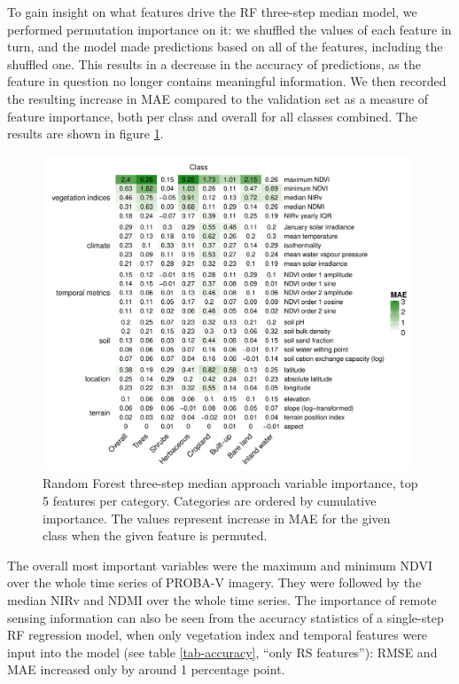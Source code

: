 \documentclass[review,authoryear,3p]{elsarticle}
\begin{document}
To gain insight on what features drive the \gls{RF} three-step median model, we performed permutation importance on it:
we shuffled the values of each feature in turn, and the model made predictions based on all of the features, including the shuffled one.
This results in a decrease in the accuracy of predictions, as the feature in question no longer contains meaningful information.
We then recorded the resulting increase in \gls{MAE} compared to the validation set as a measure of feature importance, both per class and overall for all classes combined.
%
The results are shown in figure \ref{fig-varimp}.

\begin{figure}
    \centering
    \includegraphics[width=11cm]{article-figures/heatmaps/2020-11-06-varimp-heatmap-top5}
    \caption{Random Forest three-step median approach variable importance, top 5 features per category. Categories are ordered by cumulative importance. The values represent increase in MAE for the given class when the given feature is permuted.}
    \label{fig-varimp}
\end{figure}

The overall most important variables were the maximum and minimum \gls{NDVI} over the whole time series of PROBA-V imagery.
They were followed by the median \gls{NIRv} and \gls{NDMI} over the whole time series.
The importance of remote sensing information can also be seen from the accuracy statistics of a single-step \gls{RF} regression model, when only vegetation index and temporal features were input into the model (see table \ref{tab-accuracy}, ``only RS features''):
\gls{RMSE} and \gls{MAE} increased only by around 1 percentage point.
\end{document}

